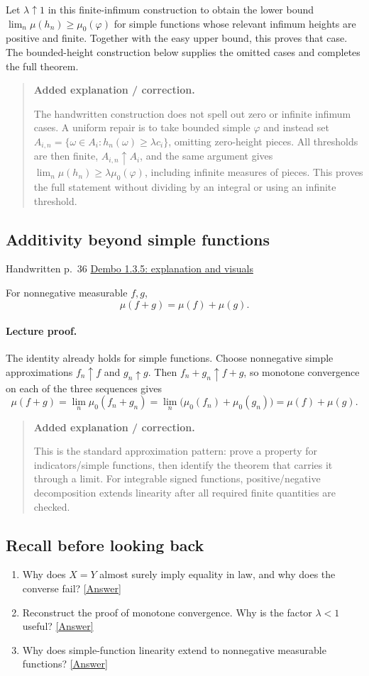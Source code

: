 \documentclass[11pt,letterpaper]{article}
\newcommand{\lecturesection}[1]{\subsection{#1}}
\begin{document}
Let $\lambda\uparrow1$ in this finite-infimum construction to obtain the lower bound $\lim_n\mu(h_n)\ge\mu_0(\varphi)$ for simple functions whose relevant infimum heights are positive and finite. Together with the easy upper bound, this proves that case. The bounded-height construction below supplies the omitted cases and completes the full theorem.

\begin{quote}\small\textbf{Added explanation / correction.}

The handwritten construction does not spell out zero or infinite infimum cases. A uniform repair is to take bounded simple $\varphi$ and instead set $A_{i,n}=\{\omega\in A_i:h_n(\omega)\ge\lambda c_i\}$, omitting zero-height pieces. All thresholds are then finite, $A_{i,n}\uparrow A_i$, and the same argument gives $\lim_n\mu(h_n)\ge\lambda\mu_0(\varphi)$, including infinite measures of pieces. This proves the full statement without dividing by an integral or using an infinite threshold.
\end{quote}

\hypertarget{l4-s9}{}
\lecturesection{Additivity beyond simple functions}
{\small\textcolor{lectureink}{Handwritten p.\ 36} \quad \href{https://josephrbailey.com/probability/\#entry-1-3-5}{Dembo 1.3.5: explanation and visuals}}

For nonnegative measurable $f,g$, \[\mu(f+g)=\mu(f)+\mu(g).\]

\paragraph{Lecture proof.}
The identity already holds for simple functions. Choose nonnegative simple approximations $f_n\uparrow f$ and $g_n\uparrow g$. Then $f_n+g_n\uparrow f+g$, so monotone convergence on each of the three sequences gives \[\mu(f+g)=\lim_n\mu_0(f_n+g_n)=\lim_n\bigl(\mu_0(f_n)+\mu_0(g_n)\bigr)=\mu(f)+\mu(g).\]

\begin{quote}\small\textbf{Added explanation / correction.}

This is the standard approximation pattern: prove a property for indicators/simple functions, then identify the theorem that carries it through a limit. For integrable signed functions, positive/negative decomposition extends linearity after all required finite quantities are checked.
\end{quote}

\subsection*{Recall before looking back}
\begin{enumerate}
\item Why does $X=Y$ almost surely imply equality in law, and why does the converse fail? \hyperlink{answer-l4-s2}{[Answer]}
\item Reconstruct the proof of monotone convergence. Why is the factor $\lambda<1$ useful? \hyperlink{answer-l4-s8}{[Answer]}
\item Why does simple-function linearity extend to nonnegative measurable functions? \hyperlink{answer-l4-s9}{[Answer]}
\end{enumerate}
\end{document}
